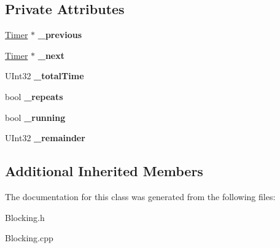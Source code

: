 \subsection*{Private Attributes}
\begin{DoxyCompactItemize}
\item 
\mbox{\label{class_timer_af29bc3b035c336192bdd3cfab062048b}} 
\hyperlink{class_timer}{Timer} $\ast$ {\bfseries \+\_\+previous}
\item 
\mbox{\label{class_timer_a61019818dd63fa3869bc7132660c763c}} 
\hyperlink{class_timer}{Timer} $\ast$ {\bfseries \+\_\+next}
\item 
\mbox{\label{class_timer_a886c7dfcc3bdc04811f7103698d3fe44}} 
U\+Int32 {\bfseries \+\_\+total\+Time}
\item 
\mbox{\label{class_timer_aea9014fe4cb66337eeb4c6546c7c1e41}} 
bool {\bfseries \+\_\+repeats}
\item 
\mbox{\label{class_timer_a0e92367e8b9f4fe50e7395d01db259af}} 
bool {\bfseries \+\_\+running}
\item 
\mbox{\label{class_timer_a5403d0936031df52425edb00b7f779d4}} 
U\+Int32 {\bfseries \+\_\+remainder}
\end{DoxyCompactItemize}
\subsection*{Additional Inherited Members}


The documentation for this class was generated from the following files\+:\begin{DoxyCompactItemize}
\item 
Blocking.\+h\item 
Blocking.\+cpp\end{DoxyCompactItemize}
